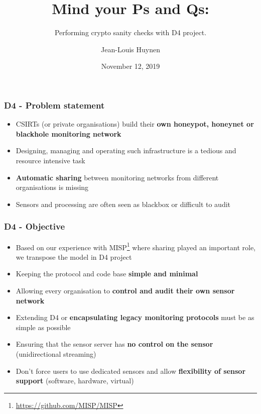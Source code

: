 \documentclass{beamer}
\title{Mind your Ps and Qs: }
\subtitle{Performing crypto sanity checks with D4 project.}
\author{Jean-Louis Huynen}
\institute{Team CIRCL \\ \url{https://www.d4-project.org/}}
\date{November 12, 2019}
\begin{document}
    \begin{frame}
        \maketitle
    \end{frame}

\begin{frame}
        \frametitle{D4 - Problem statement}
        \begin{itemize}
                \item CSIRTs (or private organisations) build their {\bf own honeypot, honeynet or blackhole monitoring network}
                \item Designing, managing and operating such infrastructure is a tedious and resource intensive task
                \item {\bf Automatic sharing} between monitoring networks from different organisations is missing
                \item Sensors and processing are often seen as blackbox or difficult to audit

        \end{itemize}
\end{frame}


\begin{frame}
 \frametitle{D4 - Objective}
 \begin{itemize}
         \item Based on our experience with
           MISP\footnote{\url{https://github.com/MISP/MISP}} where sharing
           played an important role, we transpose the model in D4 project
         \item Keeping the protocol and code base {\bf simple and minimal}
         \item Allowing every organisation to {\bf control and audit their own sensor network}
         \item Extending D4 or {\bf encapsulating legacy monitoring protocols} must be as simple as possible
         \item Ensuring that the sensor server has {\bf no control on the sensor} (unidirectional streaming)
         \item Don't force users to use dedicated sensors and allow {\bf flexibility of sensor support} (software, hardware, virtual)

 \end{itemize}
\end{frame}
\end{document}
